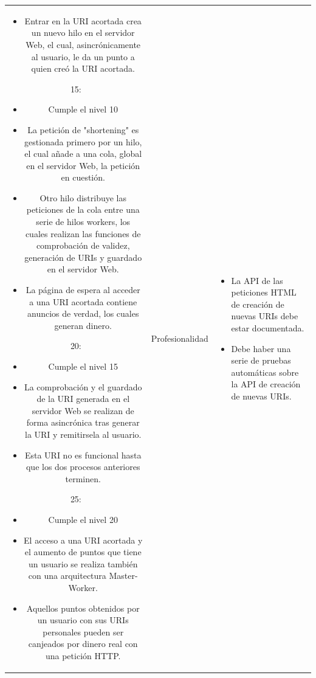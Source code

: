 \documentclass{article}
\begin{document}
\begin{table}[hbtp]
\begin{tabulary}{\textwidth}{ C L }
\begin{itemize}
        \item Entrar en la URI acortada crea un nuevo hilo en el servidor Web, el cual, asincrónicamente al usuario, le da un punto a quien creó la URI acortada.
    \end{itemize} 
    15:
    \begin{itemize}
        \item Cumple el nivel 10
        
        \item La petición de "shortening" es gestionada primero por un hilo, el cual añade a una cola, global en el servidor Web, la petición en cuestión.
        
        \item Otro hilo distribuye las peticiones de la cola entre una serie de hilos workers, los cuales realizan las funciones de comprobación de validez, generación de URIs y guardado en el servidor Web.
        
        \item La página de espera al acceder a una URI acortada contiene anuncios de verdad, los cuales generan dinero.
	\end{itemize} 
    20:
    \begin{itemize}
        \item Cumple el nivel 15
        
        \item La comprobación y el guardado de la URI generada en el servidor Web se realizan de forma asincrónica tras generar la URI y remitirsela al usuario. 
        
        \item Esta URI no es funcional hasta que los dos procesos anteriores terminen.
	\end{itemize}
    25:
    \begin{itemize}
        \item Cumple el nivel 20
        
        \item El acceso a una URI acortada y el aumento de puntos que tiene un usuario se realiza también con una arquitectura Master-Worker.
 
        \item Aquellos puntos obtenidos por un usuario con sus URIs personales pueden ser canjeados por dinero real con una petición HTTP.
	\end{itemize} &
 
    Profesionalidad & 
    \begin{itemize}
        \item La API de las peticiones HTML de creación de nuevas URIs debe estar documentada.
	    \item Debe haber una serie de pruebas automáticas sobre la API de creación de nuevas URIs.
    \end{itemize}
 
    \end{tabulary}
\end{table}
 
\end{document}
